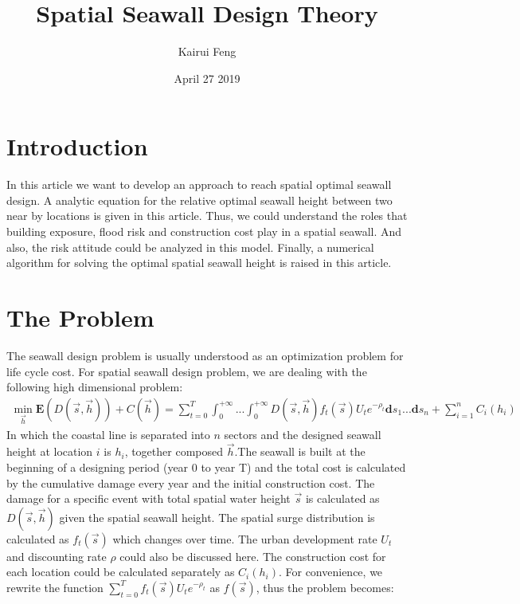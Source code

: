 \documentclass{article}
\title{Spatial Seawall Design Theory}
\author{Kairui Feng}
\date{April 27 2019}
\begin{document}
\maketitle

\section{Introduction}
In this article we want to develop an approach to reach spatial optimal seawall design. A analytic equation for the relative optimal seawall height between two near by locations is given in this article. Thus, we could understand the roles that building exposure, flood risk and construction cost play in a spatial seawall. And also, the risk attitude could be analyzed in this model. Finally, a numerical algorithm for solving the optimal spatial seawall height is raised in this article.

\section{The Problem}
The seawall design problem is usually understood as an optimization problem for life cycle cost. For spatial seawall design problem, we are dealing with the following high dimensional problem:
    \begin{align}
        \min_{\vec{h}} \mathbf{E}(D(\vec{s},\vec{h}))+C(\vec{h}) = \sum_{t=0}^{T}\int_{0}^{+\infty}...\int_{0}^{+\infty}D(\vec{s},\vec{h})f_t(\vec{s})U_te^{-\rho_t}\mathbf{d} s_1...\mathbf{d} s_n+\sum_{i=1}^n C_i(h_i)
    \end{align}
In which the coastal line is separated into $n$ sectors and the designed seawall height at location $i$ is $h_i$, together composed $\vec{h}$.The seawall is built at the beginning of a designing period (year 0 to year T) and the total cost is calculated by the cumulative damage every year and the initial construction cost. The damage for a specific event with total spatial water height $\vec{s}$ is calculated as $D(\vec{s},\vec{h})$ given the spatial seawall height. The spatial surge distribution is calculated as $f_t(\vec{s})$ which changes over time. The urban development rate $U_t$ and discounting rate $\rho$ could also be discussed here. The construction cost for each location could be calculated separately as $C_i(h_i)$. For convenience, we rewrite the function $\sum_{t=0}^Tf_t(\vec{s})U_te^{-\rho_t}$ as $f(\vec{s})$, thus the problem becomes:
\end{document}
